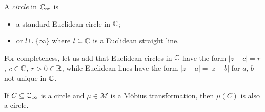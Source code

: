 \documentclass{../../template/note}
\begin{document}
    \begin{definition}
        A \emph{circle} in \(\mathbb C_\infty\) is
        \begin{itemize}
            \item a standard Euclidean circle in \(\mathbb C\);
            \item or \(l \cup \{\infty\}\) where \(l \subseteq \mathbb C\) is a Euclidean straight line.
        \end{itemize}
    \end{definition}
    
    \begin{remark}
        For completeness, let us add that Euclidean circles in \(\mathbb C\) have the form \(|z-c| = r\), \(c \in \mathbb C\), \(r > 0 \in \mathbb R\), while Euclidean lines have the form \(|z-a| = |z-b|\) for \(a\), \(b\) not unique in \(\mathbb C\).
    \end{remark}
    
    \begin{theorem}
        If \(C \subseteq \mathbb C_\infty\) is a circle and \(\mu \in \mathcal M\) is a M\"obius transformation, then \(\mu(C)\) is also a circle.
    \end{theorem}
    
\end{document}
